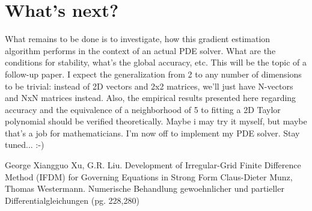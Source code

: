 \section{What's next?}
What remains to be done is to investigate, how this gradient estimation algorithm performs in the context of an actual PDE solver. What are the conditions for stability, what's the global accuracy, etc. This will be the topic of a follow-up paper. I expect the generalization from 2 to any number of dimensions to be trivial: instead of 2D vectors and 2x2 matrices, we'll just have N-vectors and NxN matrices instead. Also, the empirical results presented here regarding accuracy and the equivalence of a neighborhood of 5 to fitting a 2D Taylor polynomial should be verified theoretically. Maybe i may try it myself, but maybe that's a job for mathematicians. I'm now off to implement my PDE solver. Stay tuned... :-)




\begin{thebibliography}{9}  %
  George Xiangguo Xu, G.R. Liu. Development of Irregular-Grid Finite Difference Method (IFDM) for Governing Equations in Strong Form
  Claus-Dieter Munz, Thomas Westermann. Numerische Behandlung gewoehnlicher und partieller Differentialgleichungen (pg. 228,280)
\end{thebibliography}


\begin{comment}

The plots for this paper can be generated with some code in the main RS-MET codebase via the
function meshGradientErrorVsDistance() in the TestsRosicAndRapt project.


\end{comment}

